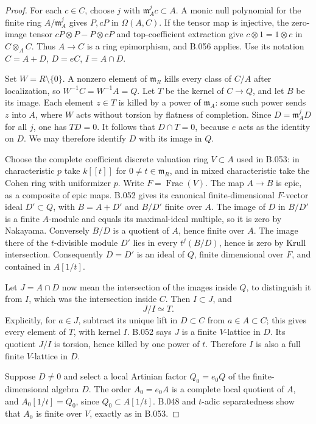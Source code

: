 \begin{proof}
For each $c\in C$, choose $j$ with
$\mathfrak m_A^jc\subset A$. A monic null polynomial
for the finite ring $A/\mathfrak m_A^j$ gives $P,cP$
in $\Omega(A,C)$. If the tensor map is injective,
the zero-image tensor $cP\otimes P-P\otimes cP$
and top-coefficient extraction give
$c\otimes1=1\otimes c$ in $C\otimes_A C$.
Thus $A\to C$ is a ring epimorphism, and B.056 applies.
Use its notation $C=A+D$, $D=eC$, $I=A\cap D$.

Set $W=R\setminus\{0\}$. A nonzero element of
$\mathfrak m_R$ kills every class of $C/A$ after
localization, so $W^{-1}C=W^{-1}A=Q$.
Let $T$ be the kernel of $C\to Q$, and let $B$ be
its image. Each element $z\in T$ is killed by a
power of $\mathfrak m_A$: some such power sends
$z$ into $A$, where $W$ acts without torsion by
flatness of completion. Since $D=\mathfrak m_A^jD$
for all $j$, one has $TD=0$. It follows that
$D\cap T=0$, because $e$ acts as the identity on
$D$. We may therefore identify $D$ with its image
in $Q$.

Choose the complete coefficient discrete valuation
ring $V\subset A$ used in B.053: in characteristic
$p$ take $k[[t]]$ for $0\ne t\in\mathfrak m_R$,
and in mixed characteristic take the Cohen ring
with uniformizer $p$. Write $F=\operatorname{Frac}(V)$.
The map $A\to B$ is epic, as a composite of epic
maps. B.052 gives its canonical finite-dimensional
$F$-vector ideal $D'\subset Q$, with
$B=A+D'$ and $B/D'$ finite over $A$.
The image of $D$ in $B/D'$ is a finite $A$-module
and equals its maximal-ideal multiple, so it is
zero by Nakayama. Conversely $B/D$ is a quotient
of $A$, hence finite over $A$. The image there
of the $t$-divisible module $D'$ lies in every
$t^j(B/D)$, hence is zero by Krull intersection.
Consequently $D=D'$ is an ideal of $Q$, finite
dimensional over $F$, and contained in $A[1/t]$.

Let $J=A\cap D$ now mean the intersection of the
images inside $Q$, to distinguish it from $I$,
which was the intersection inside $C$. Then
$I\subset J$, and
\[
                              J/I\simeq T.                \tag{B57.2}
\]
Explicitly, for $a\in J$, subtract its unique lift
in $D\subset C$ from $a\in A\subset C$; this
gives every element of $T$, with kernel $I$.
B.052 says $J$ is a finite $V$-lattice in $D$.
Its quotient $J/I$ is torsion, hence killed by
one power of $t$. Therefore $I$ is also a full
finite $V$-lattice in $D$.

Suppose $D\ne0$ and select a local Artinian factor
$Q_0=e_0Q$ of the finite-dimensional algebra $D$.
The order $A_0=e_0A$ is a complete local quotient
of $A$, and $A_0[1/t]=Q_0$, since
$Q_0\subset A[1/t]$. B.048 and $t$-adic
separatedness show that $A_0$ is finite over $V$,
exactly as in B.053.


\end{proof}
